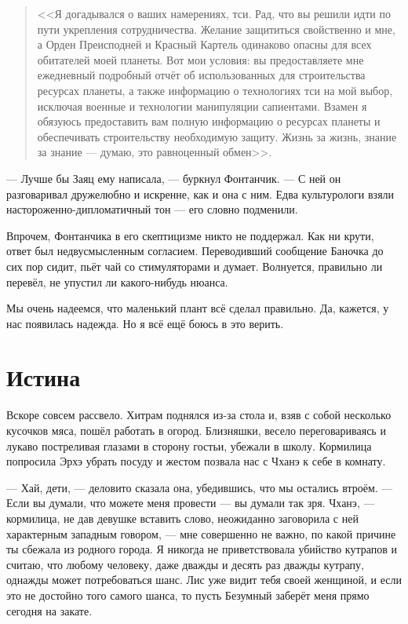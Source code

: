 \begin{quote}
<<Я догадывался о ваших намерениях, тси.
Рад, что вы решили идти по пути укрепления сотрудничества.
Желание защититься свойственно и мне, а Орден Преисподней и Красный Картель одинаково опасны для всех обитателей моей планеты.
Вот мои условия: вы предоставляете мне ежедневный подробный отчёт об использованных для строительства ресурсах планеты, а также информацию о технологиях тси на мой выбор, исключая военные и технологии манипуляции сапиентами.
Взамен я обязуюсь предоставить вам полную информацию о ресурсах планеты и обеспечивать строительству необходимую защиту.
Жизнь за жизнь, знание за знание --- думаю, это равноценный обмен>>.
\end{quote}

--- Лучше бы Заяц ему написала, --- буркнул Фонтанчик.
--- С ней он разговаривал дружелюбно и искренне, как и она с ним.
Едва культурологи взяли настороженно-дипломатичный тон --- его словно подменили.

Впрочем, Фонтанчика в его скептицизме никто не поддержал.
Как ни крути, ответ был недвусмысленным согласием.
Переводивший сообщение Баночка до сих пор сидит, пьёт чай со стимуляторами и думает.
Волнуется, правильно ли перевёл, не упустил ли какого-нибудь нюанса.

Мы очень надеемся, что маленький плант всё сделал правильно.
Да, кажется, у нас появилась надежда.
Но я всё ещё боюсь в это верить.

\section{Истина}

Вскоре совсем рассвело.
Хитрам поднялся из-за стола и, взяв с собой несколько кусочков мяса, пошёл работать в огород.
Близняшки, весело переговариваясь и лукаво постреливая глазами в сторону гостьи, убежали в школу.
Кормилица попросила Эрхэ убрать посуду и жестом позвала нас с Чханэ к себе в комнату.

--- Хай, дети, --- деловито сказала она, убедившись, что мы остались втроём.
--- Если вы думали, что можете меня провести --- вы думали так зря.
Чханэ, --- кормилица, не дав девушке вставить слово, неожиданно заговорила с ней характерным западным говором, --- мне совершенно не важно, по какой причине ты сбежала из родного города.
Я никогда не приветствовала убийство кутрапов и считаю, что любому человеку, даже дважды и десять раз дважды кутрапу, однажды может потребоваться шанс.
Лис уже видит тебя своей женщиной, и если это не достойно того самого шанса, то пусть Безумный заберёт меня прямо сегодня на закате.

